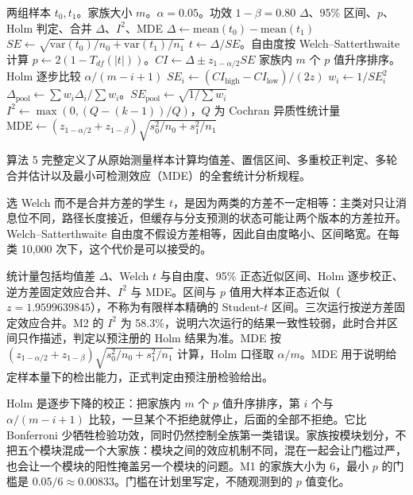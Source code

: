 \begin{algorithm}[H]
\caption{统计判定与合并}
\label{alg:stats}
\begin{algorithmic}[1]
\Require 两组样本 $t_0,t_1$。家族大小 $m$。$\alpha=0.05$。功效 $1-\beta=0.80$
\Ensure $\Delta$、95\% 区间、$p$、Holm 判定、合并 $\Delta$、$I^2$、MDE
\State $\Delta \gets \mathrm{mean}(t_0)-\mathrm{mean}(t_1)$
\State $SE \gets \sqrt{\mathrm{var}(t_0)/n_0+\mathrm{var}(t_1)/n_1}$
\State $t \gets \Delta/SE$。自由度按 Welch--Satterthwaite 计算
\State $p \gets 2(1-T_{df}(|t|))$。$CI \gets \Delta \pm z_{1-\alpha/2}SE$
\State 家族内 $m$ 个 $p$ 值升序排序。Holm 逐步比较 $\alpha/(m-i+1)$
  \State $SE_i \gets (CI_{\mathrm{high}}-CI_{\mathrm{low}})/(2z)$
  \State $w_i \gets 1/SE_i^2$
\EndFor
\State $\Delta_{\mathrm{pool}} \gets \sum w_i\Delta_i/\sum w_i$。$SE_{\mathrm{pool}} \gets \sqrt{1/\sum w_i}$
\State $I^2 \gets \max(0,(Q-(k-1))/Q)$，$Q$ 为 Cochran 异质性统计量
\State $\mathrm{MDE} \gets (z_{1-\alpha/2}+z_{1-\beta})\sqrt{s_0^2/n_0+s_1^2/n_1}$
\end{algorithmic}
\end{algorithm}

算法 5 完整定义了从原始测量样本计算均值差、置信区间、多重校正判定、多轮合并估计以及最小可检测效应（MDE）的全套统计分析规程。

选 Welch 而不是合并方差的学生 $t$，是因为两类的方差不一定相等：主类对只让消息位不同，路径长度接近，但缓存与分支预测的状态可能让两个版本的方差拉开。Welch--Satterthwaite 自由度不假设方差相等，因此自由度略小、区间略宽。在每类 10,000 次下，这个代价是可以接受的。

统计量包括均值差 $\Delta$、Welch $t$ 与自由度、95\% 正态近似区间、Holm 逐步校正、逆方差固定效应合并、$I^2$ 与 MDE。区间与 $p$ 值用大样本正态近似（$z=1.9599639845$），不称为有限样本精确的 Student-$t$ 区间。三次运行按逆方差固定效应合并。M2 的 $I^2$ 为 58.3\%，说明六次运行的结果一致性较弱，此时合并区间只作描述，判定以预注册的 Holm 结果为准。MDE 按 $(z_{1-\alpha/2}+z_{1-\beta})\sqrt{s_0^2/n_0+s_1^2/n_1}$ 计算，Holm 口径取 $\alpha/m$。MDE 用于说明给定样本量下的检出能力，正式判定由预注册检验给出。 %

Holm 是逐步下降的校正：把家族内 $m$ 个 $p$ 值升序排序，第 $i$ 个与 $\alpha/(m-i+1)$ 比较，一旦某个不拒绝就停止，后面的全部不拒绝。它比 Bonferroni 少牺牲检验功效，同时仍然控制全族第一类错误。家族按模块划分，不把五个模块混成一个大家族：模块之间的效应机制不同，混在一起会让门槛过严，也会让一个模块的阳性掩盖另一个模块的问题。M1 的家族大小为 6，最小 $p$ 的门槛是 $0.05/6\approx0.00833$。门槛在计划里写定，不随观测到的 $p$ 值变化。

